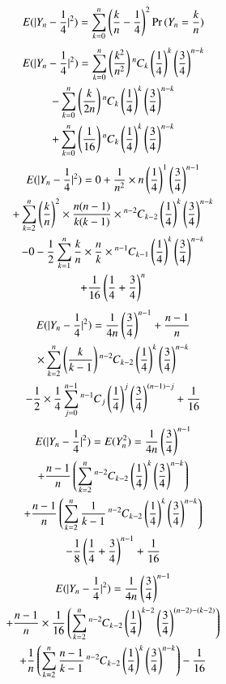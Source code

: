 \documentclass[journal,12pt,twocolumn]{IEEEtran}
\begin{document}
\begin{align}
    E(\lvert Y_n-\frac{1}{4}\rvert^2) = \sum_{k=0}^{n} \brak{\frac{k}{n} - \frac{1}{4}}^2\Pr{(Y_n = \frac{k}{n})}
\end{align}
\begin{multline}
    E(\lvert Y_n-\frac{1}{4}\rvert^2) = \sum_{k=0}^{n} \brak{\frac{k^2}{n^2}}\comb[n]{k} \brak{\frac{1}{4}}^{k} \brak{\frac{3}{4}}^{n-k}
    \\ -  \sum_{k=0}^{n} \brak{\frac{k}{2n}}\comb[n]{k} \brak{\frac{1}{4}}^{k} \brak{\frac{3}{4}}^{n-k}
    \\ +  \sum_{k=0}^{n} \brak{\frac{1}{16}}\comb[n]{k} \brak{\frac{1}{4}}^{k} \brak{\frac{3}{4}}^{n-k}
\end{multline}
\begin{multline}
    E(\lvert Y_n-\frac{1}{4}\rvert^2) =0 + \frac{1}{n^2}\times n\brak{\frac{1}{4}}^{1} \brak{\frac{3}{4}}^{n-1} 
    \\+ \sum_{k=2}^{n} \brak{\frac{k}{n}}^2\times\frac{n(n-1)}{k(k-1)}
    \times\comb[n-2]{k-2}\brak{\frac{1}{4}}^{k} \brak{\frac{3}{4}}^{n-k}
    \\ - 0 - \frac{1}{2}\sum_{k=1}^{n} \frac{k}{n}\times\frac{n}{k}\times\comb[n-1]{k-1}\brak{\frac{1}{4}}^{k} \brak{\frac{3}{4}}^{n-k}
    \\+\frac{1}{16}\brak{\frac{1}{4} + \frac{3}{4}}^n
\end{multline}
\begin{multline}
    E(\lvert Y_n-\frac{1}{4}\rvert^2) =  \frac{1}{4n}\brak{\frac{3}{4}}^{n-1} + \frac{n-1}{n} 
   \\\times\sum_{k=2}^{n} \brak{\frac{k}{k-1}}\comb[n-2]{k-2}\brak{\frac{1}{4}}^{k} \brak{\frac{3}{4}}^{n-k}
   \\ - \frac{1}{2}\times \frac{1}{4}\sum_{j=0}^{n-1} \comb[n-1]{j}\brak{\frac{1}{4}}^{j} \brak{\frac{3}{4}}^{(n-1)-j} + \frac{1}{16}
\end{multline}
\begin{multline}
    E(\lvert Y_n-\frac{1}{4}\rvert^2) =  E(Y_n^2) = \frac{1}{4n}\brak{\frac{3}{4}}^{n-1} \\+ \frac{n-1}{n} 
   \brak{\sum_{k=2}^{n}\comb[n-2]{k-2}\brak{\frac{1}{4}}^{k} \brak{\frac{3}{4}}^{n-k} }
   \\+\frac{n-1}{n} \brak{\sum_{k=2}^{n}\frac{1}{k-1}\comb[n-2]{k-2}\brak{\frac{1}{4}}^{k} \brak{\frac{3}{4}}^{n-k} } 
   \\ - \frac{1}{8}\brak{\frac{1}{4} + \frac{3}{4}}^{n-1} + \frac{1}{16}
\end{multline}
\begin{multline}
   E(\lvert Y_n-\frac{1}{4}\rvert^2) = \frac{1}{4n}\brak{\frac{3}{4}}^{n-1} \\+ \frac{n-1}{n} \times\frac{1}{16} 
   \brak{\sum_{k=2}^{n}\comb[n-2]{k-2}\brak{\frac{1}{4}}^{k-2} \brak{\frac{3}{4}}^{(n-2)-(k-2)} }
   \\+\frac{1}{n} \brak{\sum_{k=2}^{n}\frac{n-1}{k-1}\comb[n-2]{k-2}\brak{\frac{1}{4}}^{k} \brak{\frac{3}{4}}^{n-k} } - \frac{1}{16}
\end{multline}
\end{document}
